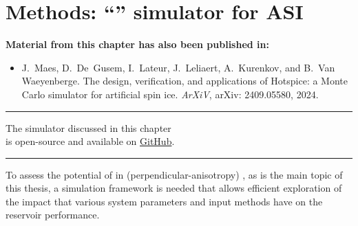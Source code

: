 \chapter{Methods: ``\hotspice'' simulator for ASI}\label{ch:Hotspice}

\begin{adjustwidth}{2em}{2em} %
    \begin{center}
        \textbf{Material from this chapter has also been published in:} \\
    \end{center}
    \vspace{1em}
    \begin{adjustwidth}{0em}{1.5em}
	    \begin{itemize}
	    	\item[\cite{MAES-24}] J.~Maes, D.~De~Gusem, I.~Lateur, J.~Leliaert, A.~Kurenkov, and B.~Van Waeyenberge.
	    	\newblock The design, verification, and applications of Hotspice: a Monte Carlo simulator for artificial spin ice.
	    	\newblock \emph{ArXiV}, arXiv: 2409.05580, 2024.
	    \end{itemize}
    \end{adjustwidth}
    \vspace{0.5em}
    \begin{center}
        \centering\rule{0.7\linewidth}{0.4pt}
    \end{center}
    \vspace{.5em}
    \begin{center}
    	The \hotspice simulator discussed in this chapter\\
    	is open-source and available on \href{https://github.com/bvwaeyen/Hotspice}{GitHub}. \\
    \end{center}
    \begin{center}
    \centering\rule{0.7\linewidth}{0.4pt}
    \end{center}
    \vspace{1em}
\end{adjustwidth}

To assess the potential of  in (perpendicular-anisotropy) , as is the main topic of this thesis, a simulation framework is needed that allows efficient exploration of the impact that various system parameters and input methods have on the reservoir performance. \\\par

